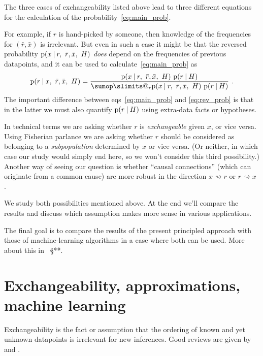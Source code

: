 \documentclass[\ifafour a4paper,12pt,\else a5paper,10pt,\fi%
onecolumn,oneside,article,%
british%
]{memoir}
\makeatletter
\theoremstyle{remark}
\theoremstyle{innote}
\def\sum{\DOTSI\sumop\slimits@}
\newcommand*{\citey}{\parencites*}
\newcommand*{\p}{\mathrm{p}}%
\renewcommand*{\|}[1][]{\nonscript\:#1\vert\nonscript\:\mathopen{}}
\renewcommand*{\=}{\TextOrMath\texteq\eq}
\newcommand*{\sect}{\S}%
\newcommand*{\sects}{\S\S}%
\newcommand*{\eqns}{eqs}%
\newcommand*{\cf}{{cf.}}
\newcommand*{\wrench}{{\fontencoding{U}\fontfamily{fontawesomethree}\selectfont\symbol{114}}}
\newcommand{\mynote}[1]{ {\color{notecolour}#1}}
\newcommand*{\ro}{r}
\newcommand*{\xo}{x}
\newcommand*{\br}{\bar{r}}
\newcommand*{\bx}{\bar{x}}
\makeatother
\begin{document}
\bigskip

The three cases of exchangeability listed above lead to three different
equations for the calculation of the probability~\eqref{eq:main_prob}.


For example, if $\ro$ is
hand-picked by someone, then knowledge of the frequencies for $(\br,\bx)$
is irrelevant. But even in such a case it might be that the reversed
probability $\p(\xo \| \ro,\ \br,\bx,\ H)$ \emph{does} depend on the
frequencies of previous datapoints, and it can be used to
calculate~\eqref{eq:main_prob} as
\begin{equation}
  \label{eq:rev_prob}
  \p(\ro \| \xo,\ \br,\bx,\ H) =
  \frac{\p(\xo \| \ro,\ \br,\bx,\ H)\ \p(\ro \| H)}{
    \sum_{\ro}\p(\xo \| \ro,\ \br,\bx,\ H)\ \p(\ro \| H)}
\ .
\end{equation}
The important difference between \eqns~\eqref{eq:main_prob} and
\eqref{eq:rev_prob} is that in the latter we must also quantify
$\p(\ro \| H)$ using extra-data facts or hypotheses.

In technical terms we are asking whether $\ro$ is \emph{exchangeable}
given $\xo$, or vice versa. Using Fisherian \citey[\sects~II.4,
IV.1]{fisher1956} parlance we are asking whether $\ro$ should be
considered as belonging to a \emph{subpopulation} determined by $\xo$ or
vice versa. (Or neither, in which case our study would simply end here, so
we won't consider this third possibility.) Another way of seeing our
question is whether \enquote{causal connections} (which can originate from
a common cause) are more robust in the direction
$\xo \rightsquigarrow \ro$ or $\ro \rightsquigarrow \xo$
\parencites[\cf][\sects~2.1.2, 2.2.5]{pearl1988}.


We study both possibilities mentioned above. At the end we'll compare the
results and discuss which assumption makes more sense in various
applications.

The final goal is to compare the results of the present principled approach
with those of machine-learning algorithms in a case where both can be used.
More about this in \mynote{\wrench\ \sect***}.

\section{Exchangeability, approximations, machine learning}
\label{sec:exchang}

Exchangeability is the fact or assumption that the ordering of
known and yet unknown datapoints is irrelevant for new inferences. Good
reviews are given by \textcite{dawid2013} and
\textcite[\sect~4.2]{bernardoetal1994}.
\end{document}
